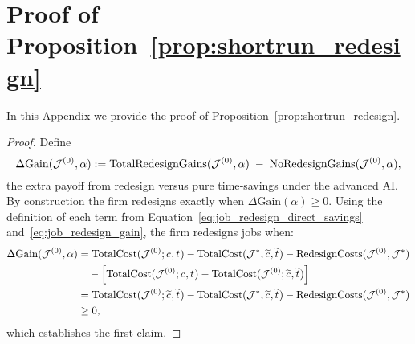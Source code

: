 \documentclass{article}
\theoremstyle{plain}
\theoremstyle{plain}
\begin{document}
\section{Proof of Proposition~\ref{prop:shortrun_redesign}}
\label{app:shortrun_redesign_proof}

In this Appendix we provide the proof of Proposition~\ref{prop:shortrun_redesign}.

\begin{proof}
Define
\[
\Delta\mathrm{Gain}(\mathcal{J}^{(0)}, \alpha)
:=
\mathrm{TotalRedesignGains}(\mathcal{J}^{(0)}, \alpha)\;-\;\text{NoRedesignGains}(\mathcal{J}^{(0)}, \alpha),
\]
the extra payoff from redesign versus pure time‐savings under the advanced AI.  
By construction the firm redesigns exactly when $\Delta\mathrm{Gain}(\alpha)\ge0$.  
Using the definition of each term from Equation~\ref{eq:job_redesign_direct_savings} and~\ref{eq:job_redesign_gain}, the firm redesigns jobs when:
\begin{align*}
\Delta\text{Gain}(\mathcal{J}^{(0)}, \alpha)
& =
\text{TotalCost}(\mathcal{J}^{(0)}; c_{}, t_{}) - \text{TotalCost}(\mathcal{J}^{*}, \widetilde{c_{}}, \widetilde{t_{}})
-
\text{RedesignCosts}(\mathcal{J}^{(0)}, \mathcal{J}^{*}) \nonumber \\
& \quad -
\Bigl[\text{TotalCost}(\mathcal{J}^{(0)}; c_{}, t_{}) - \text{TotalCost}(\mathcal{J}^{(0)}; \widetilde{c_{}}, \widetilde{t_{}})\Bigr] \nonumber \\
& =
\text{TotalCost}(\mathcal{J}^{(0)}; \widetilde{c_{}}, \widetilde{t_{}})
- 
\text{TotalCost}(\mathcal{J}^{*}, \widetilde{c_{}}, \widetilde{t_{}})
-
\text{RedesignCosts}(\mathcal{J}^{(0)}, \mathcal{J}^{*}) \nonumber \\
& \geq 0, \nonumber
\end{align*}
which establishes the first claim.


\end{proof}
\end{document}
